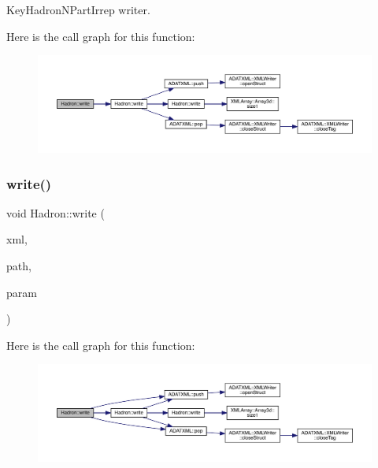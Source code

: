 Key\+Hadron\+N\+Part\+Irrep writer. 

Here is the call graph for this function\+:
\nopagebreak
\begin{figure}[H]
\begin{center}
\leavevmode
\includegraphics[width=350pt]{d1/daf/namespaceHadron_a38af8457b328042ae00ad011656edc71_cgraph}
\end{center}
\end{figure}
\mbox{\label{namespaceHadron_ac03bbcefc730bcb21021dc5c45a1b365}} 
\subsubsection{\texorpdfstring{write()}{write()}\hspace{0.1cm}{\footnotesize\ttfamily [35/95]}}
{\footnotesize\ttfamily void Hadron\+::write (\begin{DoxyParamCaption}\item[{\mbox{\hyperlink{classADATXML_1_1XMLWriter}{X\+M\+L\+Writer}} \&}]{xml,  }\item[{const std\+::string \&}]{path,  }\item[{const \mbox{\hyperlink{structHadron_1_1HadronDiagramTimeSlices__t}{Hadron\+Diagram\+Time\+Slices\+\_\+t}} \&}]{param }\end{DoxyParamCaption})}

Here is the call graph for this function\+:
\nopagebreak
\begin{figure}[H]
\begin{center}
\leavevmode
\includegraphics[width=350pt]{d1/daf/namespaceHadron_ac03bbcefc730bcb21021dc5c45a1b365_cgraph}
\end{center}
\end{figure}
\mbox{\label{namespaceHadron_ae38baf2d1cfe9fdaf455f274e722b32f}} 
